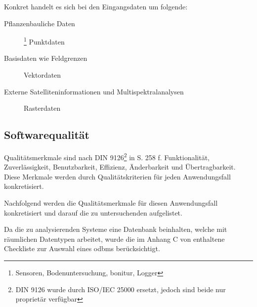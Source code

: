 Konkret handelt es sich bei den Eingangsdaten um folgende:
\begin{description}
\item[Pflanzenbauliche Daten]\footnote{Sensoren, Bodenuntersuchung, \Gls{bonitur}, Logger} Punktdaten
\item[Basisdaten wie Feldgrenzen] Vektordaten
\item[Externe Satelliteninformationen und Multispektralanalysen] Rasterdaten
\end{description}

\subsection{Softwarequalität}
\label{softwarequalität}
Qualitätsmerkmale sind nach DIN 9126\footnote{DIN 9126 wurde durch ISO/IEC 25000 ersetzt, jedoch sind beide nur proprietär verfügbar} in \cite{book:lehrbuchsoftware} S. 258 f. Funktionalität, Zuverlässigkeit, Benutzbarkeit, Effizienz, Änderbarkeit und Übertragbarkeit.
Diese Merkmale werden durch Qualitätskriterien für jeden Anwendungsfall konkretisiert.


Nachfolgend werden die Qualitätsmerkmale für diesen Anwendungsfall konkretisiert und darauf die zu untersuchenden aufgelistet.


Da die zu analysierenden Systeme eine Datenbank beinhalten, welche mit räumlichen Datentypen arbeitet, wurde die im Anhang C von \cite{book:objdbs} enthaltene Checkliste zur Auswahl eines \Gls{odbms} berücksichtigt.

